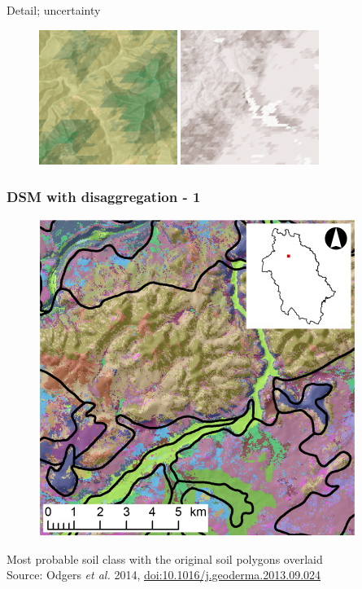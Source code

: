 \documentclass[aspectratio=169]{beamer}
\begin{document}
\begin{frame}{Detail; uncertainty}
\begin{figure}
\includegraphics[width=0.4\textwidth]{./graphics_david/SoilGridsDetail.png}
\hfill
\includegraphics[width=0.4\textwidth]{./graphics_david/SoilGridsUncertainty.png}
\end{figure}
\end{frame}

\begin{frame}
  \frametitle{DSM with disaggregation - 1}
\begin{figure}
  \includegraphics[height=0.55\textheight]{./graphics_david/1-s2.0-S0016706113003522-gr9.jpg}
\end{figure}
Most probable soil class with the original soil polygons overlaid
\\
Source: Odgers \emph{et al.} 2014, \url{doi:10.1016/j.geoderma.2013.09.024}
\end{frame}
\end{document}
